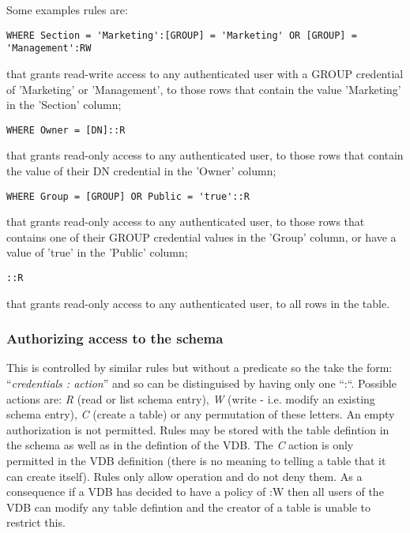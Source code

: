 Some examples rules are:

\begin{verbatim}
WHERE Section = 'Marketing':[GROUP] = 'Marketing' OR [GROUP] = 'Management':RW
\end{verbatim}

that grants read-write access to any authenticated user with a GROUP
credential of 'Marketing' or 'Management', to those rows that contain the
value 'Marketing' in the 'Section' column;

\begin{verbatim}
WHERE Owner = [DN]::R
\end{verbatim}

that grants read-only access to any authenticated user, to those rows that
contain the value of their DN credential in the 'Owner' column;

\begin{verbatim}
WHERE Group = [GROUP] OR Public = 'true'::R
\end{verbatim}

that grants read-only access to any authenticated user, to those rows
that contains one of their GROUP credential values in the 'Group' column, or
have a value of 'true' in the 'Public' column;

\begin{verbatim}
::R
\end{verbatim}

that grants read-only access to any authenticated user, to all rows in the
table.

\subsubsection{Authorizing access to the schema}
This is controlled by similar rules but without a predicate so the take the
form: ``\textit{credentials : action}'' and so can be distinguised by having
only one ``:``. Possible actions are: \textit{R} (read or list schema entry),
\textit{W} (write - i.e. modify an existing schema entry), \textit{C}
(create a table) or any permutation of these letters. An empty authorization
is not permitted. Rules may be stored with the table defintion in the schema as
well as in the defintion of the VDB. The  \textit{C} action is only permitted in
the VDB definition (there is no meaning to telling a table that it can create
itself). Rules only allow operation and do not deny them. As a consequence if
a VDB has decided to have a policy of :W then all users of the VDB can modify any table defintion
and the creator of a table is unable to restrict this.

